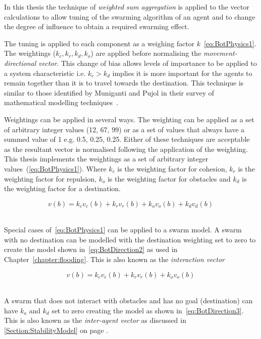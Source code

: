 In this thesis the technique of \textit{weighted sum aggregation} is applied to the vector calculations to allow tuning of the swarming algorithm of an agent and to change the degree of influence to obtain a required swarming effect. 

The tuning is applied to each component as a weighing factor $k$~\autoref{eq:BotPhysics1}. The weightings ($k_c, k_r, k_d, k_o$) are applied before normalising the \textit{movement-directional vector}. This change of bias allows levels of importance to be applied to a system characteristic i.e. $k_c > k_d$ implies it is more important for the agents to remain together than it is to travel towards the destination. This technique is similar to those identified by Muniganti and Pujol in their survey of mathematical modelling techniques~\cite{MP:10}. 

Weightings can be applied in several ways. The weighting can be applied as a set of arbitrary integer values (12, 67, 99) or as a set of values that always have a summed value of 1 e.g. 0.5, 0.25, 0.25. Either of these techniques are acceptable as the resultant vector is normalised following the application of the weighting. This thesis implements the weightings as a set of arbitrary integer values~(\autoref{eq:BotPhysics1}). Where $k_c$ is the weighting factor for cohesion, $k_r$ is the weighting factor for repulsion, $k_o$ is the weighting factor for obstacles and $k_d$ is the weighting factor for a destination. 

\begin{equation}\label{eq:BotPhysics1}‎
v(b) =‎ k_cv_c(b) + k_rv_r(b) + k_ov_o(b) + k_dv_d(b)
\end{equation}‎

Special cases of~\autoref{eq:BotPhysics1} can be applied to a swarm model. A swarm with no destination can be modelled with the destination weighting set to zero to create the model shown in~\autoref{eq:BotDirection2} as used in Chapter~\ref{chapter:flooding}. This is also known as the \textit{interaction vector}

\begin{center}
\begin{equation}
\label{eq:BotDirection2}
v(b) =‎ k_cv_c(b) + k_rv_r(b) + k_ov_o(b)
\end{equation}‎
\end{center}

A swarm that does not interact with obstacles and has no goal (destination) can have $k_o$ and $k_d$ set to zero creating the model as shown in~\autoref{eq:BotDirection3}. This is also known as the \textit{inter-agent vector} as discussed in \autoref{Section:StabilityModel} on page \pageref{Section:StabilityModel}.


